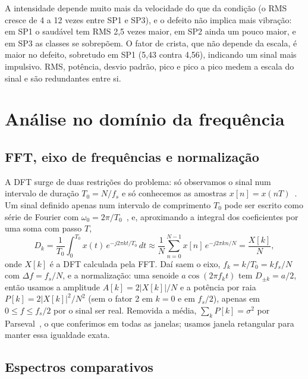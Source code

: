 \documentclass[a4paper]{article}
\begin{document}
A intensidade depende muito mais da velocidade do que da condição (o RMS cresce de 4 a 12 vezes entre SP1 e SP3), e o defeito não implica mais vibração: em SP1 o saudável tem RMS 2,5 vezes maior, em SP2 ainda um pouco maior, e em SP3 as classes se sobrepõem. O fator de crista, que não depende da escala, é maior no defeito, sobretudo em SP1 (5,43 contra 4,56), indicando um sinal mais impulsivo. RMS, potência, desvio padrão, pico e pico a pico medem a escala do sinal e são redundantes entre si.

\section{Análise no domínio da frequência}

\subsection{FFT, eixo de frequências e normalização}

A DFT surge de duas restrições do problema: só observamos o sinal num intervalo de duração $T_0 = N/f_s$ e só conhecemos as amostras $x[n] = x(nT)$~\cite[slide 15]{aula2}. Um sinal definido apenas num intervalo de comprimento $T_0$ pode ser escrito como série de Fourier com $\omega_0 = 2\pi/T_0$~\cite[slide 4]{aula8}, e, aproximando a integral dos coeficientes por uma soma com passo $T$,
\begin{equation}
D_k = \frac{1}{T_0}\int_0^{T_0} x(t)\,e^{-j2\pi kt/T_0}\,dt \approx \frac{1}{N}\sum_{n=0}^{N-1} x[n]\,e^{-j2\pi kn/N} = \frac{X[k]}{N},
\end{equation}
onde $X[k]$ é a DFT calculada pela FFT. Daí saem o eixo, $f_k = k/T_0 = k f_s/N$ com $\Delta f = f_s/N$, e a normalização: uma senoide $a\cos(2\pi f_k t)$ tem $D_{\pm k} = a/2$, então usamos a amplitude $A[k] = 2|X[k]|/N$ e a potência por raia $P[k] = 2|X[k]|^2/N^2$ (sem o fator 2 em $k = 0$ e em $f_s/2$), apenas em $0 \le f \le f_s/2$ por o sinal ser real. Removida a média, $\sum_k P[k] = \sigma^2$ por Parseval~\cite[slide 27]{aula8}, o que conferimos em todas as janelas; usamos janela retangular para manter essa igualdade exata.

\subsection{Espectros comparativos}
\end{document}
